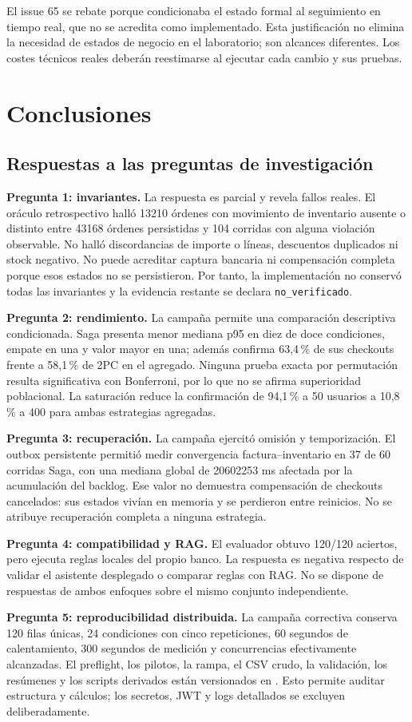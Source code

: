 \documentclass[12pt,a4paper]{article}
\newcommand{\seccion}[1]{\section{#1}}
\begin{document}
El issue 65 se rebate porque condicionaba el estado formal al seguimiento en tiempo real, que no se acredita como implementado. Esta justificación no elimina la necesidad de estados de negocio en el laboratorio; son alcances diferentes. Los costes técnicos reales deberán reestimarse al ejecutar cada cambio y sus pruebas.

\seccion{Conclusiones}
\subsection{Respuestas a las preguntas de investigación}
\textbf{Pregunta 1: invariantes.} La respuesta es parcial y revela fallos reales. El oráculo retrospectivo halló 13210 órdenes con movimiento de inventario ausente o distinto entre 43168 órdenes persistidas y 104 corridas con alguna violación observable. No halló discordancias de importe o líneas, descuentos duplicados ni stock negativo. No puede acreditar captura bancaria ni compensación completa porque esos estados no se persistieron. Por tanto, la implementación no conservó todas las invariantes y la evidencia restante se declara \texttt{no\_verificado}.

\textbf{Pregunta 2: rendimiento.} La campaña permite una comparación descriptiva condicionada. Saga presenta menor mediana p95 en diez de doce condiciones, empate en una y valor mayor en una; además confirma 63,4\,\% de sus checkouts frente a 58,1\,\% de 2PC en el agregado. Ninguna prueba exacta por permutación resulta significativa con Bonferroni, por lo que no se afirma superioridad poblacional. La saturación reduce la confirmación de 94,1\,\% a 50 usuarios a 10,8\,\% a 400 para ambas estrategias agregadas.

\textbf{Pregunta 3: recuperación.} La campaña ejercitó omisión y temporización. El outbox persistente permitió medir convergencia factura--inventario en 37 de 60 corridas Saga, con una mediana global de 20602253 ms afectada por la acumulación del backlog. Ese valor no demuestra compensación de checkouts cancelados: sus estados vivían en memoria y se perdieron entre reinicios. No se atribuye recuperación completa a ninguna estrategia.

\textbf{Pregunta 4: compatibilidad y RAG.} El evaluador obtuvo 120/120 aciertos, pero ejecuta reglas locales del propio banco. La respuesta es negativa respecto de validar el asistente desplegado o comparar reglas con RAG. No se dispone de respuestas de ambos enfoques sobre el mismo conjunto independiente.

\textbf{Pregunta 5: reproducibilidad distribuida.} La campaña correctiva conserva 120 filas únicas, 24 condiciones con cinco repeticiones, 60 segundos de calentamiento, 300 segundos de medición y concurrencias efectivamente alcanzadas. El preflight, los pilotos, la rampa, el CSV crudo, la validación, los resúmenes y los scripts derivados están versionados en . Esto permite auditar estructura y cálculos; los secretos, JWT y logs detallados se excluyen deliberadamente.
\end{document}
